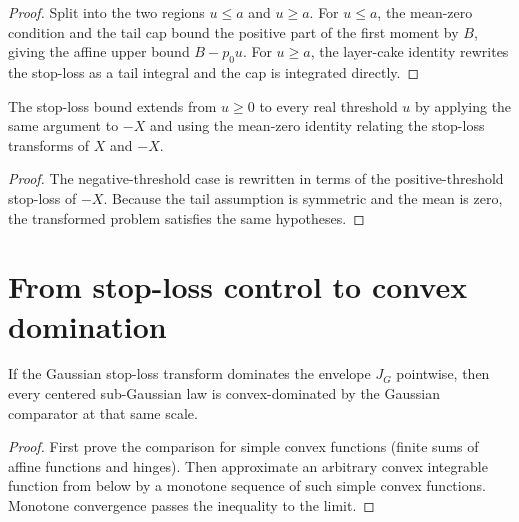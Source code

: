 \begin{proof}\leanok
Split into the two regions $u \le a$ and $u \ge a$.
For $u \le a$, the mean-zero condition and the tail cap bound the positive part
of the first moment by $B$, giving the affine upper bound
$B - p_0 u$. For $u \ge a$, the layer-cake identity rewrites the stop-loss as a
tail integral and the cap is integrated directly.
\end{proof}

\begin{theorem}\label{thm:extend-all-u}
\leanok
The stop-loss bound extends from $u \ge 0$ to every real threshold $u$ by
applying the same argument to $-X$ and using the mean-zero identity relating
the stop-loss transforms of $X$ and $-X$.
\end{theorem}

\begin{proof}\leanok
The negative-threshold case is rewritten in terms of the
positive-threshold stop-loss of $-X$. Because the tail assumption is symmetric
and the mean is zero, the transformed problem satisfies the same hypotheses.
\end{proof}

\section{From stop-loss control to convex domination}

\begin{theorem}\label{thm:cx-route}
\leanok
{}
If the Gaussian stop-loss transform dominates the envelope $J_G$ pointwise,
then every centered sub-Gaussian law is convex-dominated by the Gaussian
comparator at that same scale.
\end{theorem}

\begin{proof}\leanok
First prove the comparison for simple convex functions (finite sums of
affine functions and hinges). Then approximate an arbitrary convex integrable
function from below by a monotone sequence of such simple convex functions.
Monotone convergence passes the inequality to the limit.
\end{proof}
